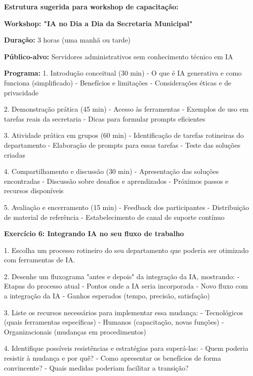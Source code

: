 \documentclass[12pt,a4paper]{book}
\begin{document}
\begin{tcolorbox}[exemplo]
\textbf{Estrutura sugerida para workshop de capacitação:}

\textbf{Workshop: "IA no Dia a Dia da Secretaria Municipal"}

\textbf{Duração:} 3 horas (uma manhã ou tarde)

\textbf{Público-alvo:} Servidores administrativos sem conhecimento técnico em IA

\textbf{Programa:}
1. Introdução conceitual (30 min)
   - O que é IA generativa e como funciona (simplificado)
   - Benefícios e limitações
   - Considerações éticas e de privacidade

2. Demonstração prática (45 min)
   - Acesso às ferramentas
   - Exemplos de uso em tarefas reais da secretaria
   - Dicas para formular prompts eficientes

3. Atividade prática em grupos (60 min)
   - Identificação de tarefas rotineiras do departamento
   - Elaboração de prompts para essas tarefas
   - Teste das soluções criadas

4. Compartilhamento e discussão (30 min)
   - Apresentação das soluções encontradas
   - Discussão sobre desafios e aprendizados
   - Próximos passos e recursos disponíveis

5. Avaliação e encerramento (15 min)
   - Feedback dos participantes
   - Distribuição de material de referência
   - Estabelecimento de canal de suporte contínuo
\end{tcolorbox}

\begin{tcolorbox}[pratica]
\textbf{Exercício 6: Integrando IA no seu fluxo de trabalho}

1. Escolha um processo rotineiro do seu departamento que poderia ser otimizado com ferramentas de IA.

2. Desenhe um fluxograma "antes e depois" da integração da IA, mostrando:
   - Etapas do processo atual
   - Pontos onde a IA seria incorporada
   - Novo fluxo com a integração da IA
   - Ganhos esperados (tempo, precisão, satisfação)

3. Liste os recursos necessários para implementar essa mudança:
   - Tecnológicos (quais ferramentas específicas)
   - Humanos (capacitação, novas funções)
   - Organizacionais (mudanças em procedimentos)

4. Identifique possíveis resistências e estratégias para superá-las:
   - Quem poderia resistir à mudança e por quê?
   - Como apresentar os benefícios de forma convincente?
   - Quais medidas poderiam facilitar a transição?
\end{tcolorbox}
\end{document}
